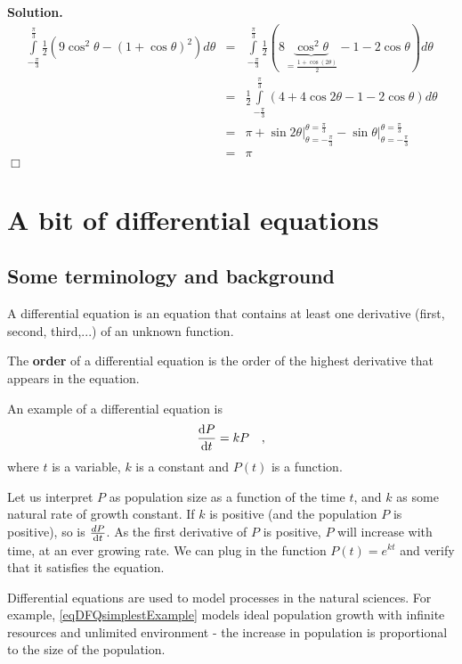 \documentclass[12pt]{book}
\newenvironment{solution}{\medskip\noindent\textbf{Solution.} }{$\Box$}
\renewcommand{\emph}{\textbf}
\begin{document}
\begin{solution}
\[
\begin{array}{rcl}
\displaystyle\int\limits_{-\frac{\pi}{3}}^{\frac{\pi}{3}} \frac{1}2\left(9\cos^2\theta-(1+\cos\theta)^2\right) d\theta&=& \displaystyle\int\limits_{-\frac{\pi}{3}}^{\frac{\pi}{3}} \frac{1}2\left(8\underbrace{\cos^2\theta}_{=\frac{1+\cos(2\theta)}2  }-1-2\cos\theta \right) d\theta\\
&=&\displaystyle\frac{1}2\int\limits_{-\frac{\pi}{3}}^{\frac{\pi}{3}} \left(4+4 \cos 2\theta-1-2\cos\theta \right) d\theta
\\
&=&\pi+\left.\sin2\theta\right|_{\theta=-\frac{\pi}{3}}^{\theta=\frac{\pi}3}-\left.\sin\theta\right|_{\theta=-\frac{\pi}{3}}^{\theta=\frac{\pi}3}\\
&=&\pi
\end{array}
\]
\end{solution}

\chapter{A bit of differential equations}
\section{Some terminology and background}
A differential equation is an equation that contains at least one derivative (first, second, third,...) of an unknown function.

The \emph{order} of a differential equation is the order of the highest derivative that appears in the equation.

An example of a differential equation is
\begin{equation}\label{eqDFQsimplestExample}
\frac{{\normalfont \text{d}} P}{{\normalfont \text{d}} t} = k P\quad ,
\end{equation}
where $t$ is a variable, $k$ is a constant and $P(t)$ is a function.

Let us interpret $P$ as population size as a function of the time $t$, and $k$ as some natural rate of growth constant. If $k$ is positive (and the population $P$ is positive), so is $\frac{d P}{{\normalfont \text{d}} t}$. As the first derivative of $P$ is positive, $P$ will increase with time, at an ever growing rate. We can plug in the function $P(t)= e^{k t}$ and verify that it satisfies the equation.

Differential equations are used to model processes in the natural sciences. For example, \ref{eqDFQsimplestExample} models ideal population growth with infinite resources and unlimited environment - the increase in population is proportional to the size of the population.
\end{document}
